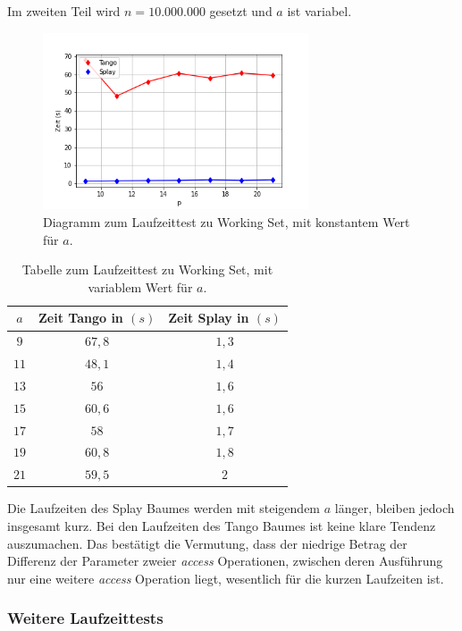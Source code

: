 \documentclass[a4paper,12pt]{article}
\begin{document}
\noindent Im zweiten Teil wird $n = 10.000.000$ gesetzt und $a$ ist variabel. 
\begin{figure}[H]
	\centering
	\includegraphics[width=0.7\textwidth]{Medien/laufzeittest/diagramm/workingset2}
	\caption{Diagramm zum Laufzeittest zu Working Set, mit konstantem Wert für $a$.}
\end{figure}
\begin{table}[H]
	\begin{center}
		\begin{tabular}[c]{|c|c|c|}
			\hline
			$a$ & Zeit Tango in $\left(s\right)$ &Zeit Splay in $\left(s\right)$ \\
			\hline
			$9$  & $67,8$ &$1,3$  \\
			\hline
			$11$  & $48,1$ &$1,4$  \\
			\hline
		    $13$  & $56$ &$1,6$  \\
			\hline
			$15$  & $60,6$ &$1,6$  \\
			\hline
			$17$  & $58$ &$1,7$  \\
			\hline
			$19$  & $60,8$ &$1,8$  \\
			\hline
			$21$  & $59,5$ &$2$  \\
			\hline
		\end{tabular}
		\caption{Tabelle zum Laufzeittest zu Working Set, mit variablem Wert für $a$.} 
	\end{center}
\end{table}


\noindent Die Laufzeiten des Splay Baumes werden mit steigendem $a$ länger, bleiben jedoch insgesamt kurz. Bei den Laufzeiten des Tango Baumes ist keine klare Tendenz auszumachen. Das bestätigt die Vermutung, dass der niedrige Betrag der Differenz der Parameter zweier \textit{access} Operationen, zwischen deren Ausführung nur eine weitere \textit{access} Operation liegt, wesentlich für die kurzen Laufzeiten ist.     
\newpage
\subsubsection{Weitere Laufzeittests}
\end{document}
